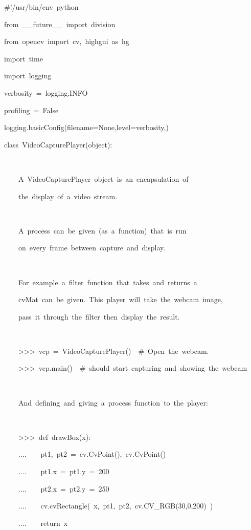 \documentclass[english]{IEEEtran}
\theoremstyle{plain}
\newenvironment{lyxcode}
{\par\begin{list}{}{
\setlength{\rightmargin}{\leftmargin}
\setlength{\listparindent}{0pt}%
\raggedright
\setlength{\itemsep}{0pt}
\setlength{\parsep}{0pt}
\normalfont\ttfamily}%
 \item[]}
{\end{list}}
\begin{document}
%
\begin{algorithm*}
\begin{lyxcode}
\#!/usr/bin/env~python

from~\_\_future\_\_~import~division

from~opencv~import~cv,~highgui~as~hg

import~time

import~logging

verbosity~=~logging.INFO

profiling~=~False

logging.basicConfig(filename=None,level=verbosity,)

class~VideoCapturePlayer(object):

~~~~\textquotedbl{}\textquotedbl{}\textquotedbl{}

~~~~A~VideoCapturePlayer~object~is~an~encapsulation~of~

~~~~the~display~of~a~video~stream.~

~~~~

~~~~A~process~can~be~given~(as~a~function)~that~is~run

~~~~on~every~frame~between~capture~and~display.

~~~~

~~~~For~example~a~filter~function~that~takes~and~returns~a~

~~~~cvMat~can~be~given.~This~player~will~take~the~webcam~image,~

~~~~pass~it~through~the~filter~then~display~the~result.

~~~~

~~~~>\textcompwordmark{}>\textcompwordmark{}>~vcp~=~VideoCapturePlayer()~~\#~Open~the~webcam.

~~~~>\textcompwordmark{}>\textcompwordmark{}>~vcp.main()~~\#~should~start~capturing~and~showing~the~webcam

~~~~

~~~~And~defining~and~giving~a~process~function~to~the~player:

~~~~

~~~~>\textcompwordmark{}>\textcompwordmark{}>~def~drawBox(x):

~~~~....~~~~pt1,~pt2~=~cv.CvPoint(),~cv.CvPoint()

~~~~....~~~~pt1.x~=~pt1.y~=~200

~~~~....~~~~pt2.x~=~pt2.y~=~250

~~~~....~~~~cv.cvRectangle(~x,~pt1,~pt2,~cv.CV\_RGB(30,0,200)~)

~~~~....~~~~return~x


\end{lyxcode}
\end{algorithm*}
\end{document}
